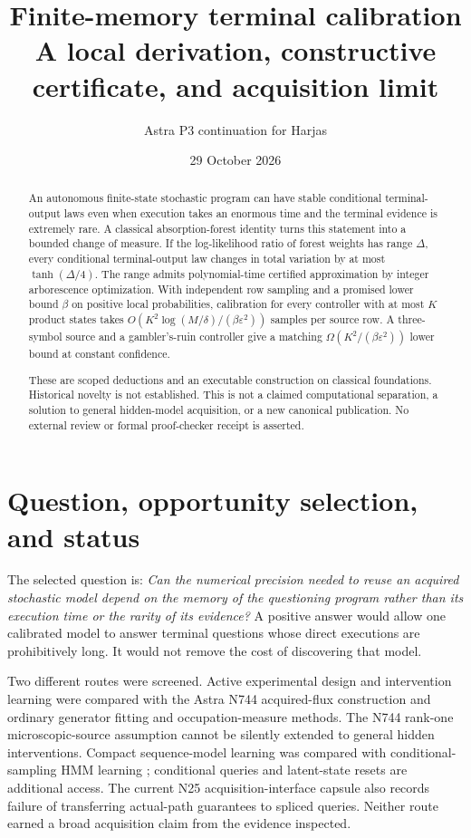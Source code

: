 \documentclass[11pt]{article}
\title{Finite-memory terminal calibration\\
\large A local derivation, constructive certificate, and acquisition limit}
\author{Astra P3 continuation for Harjas}
\date{29 October 2026}
\begin{document}
\maketitle

\begin{abstract}
An autonomous finite-state stochastic program can have stable conditional
terminal-output laws even when execution takes an enormous time and the
terminal evidence is extremely rare. A classical absorption-forest identity
turns this statement into a bounded change of measure. If the log-likelihood
ratio of forest weights has range $\Delta$, every conditional terminal-output
law changes in total variation by at most $\tanh(\Delta/4)$. The range admits
polynomial-time certified approximation by integer arborescence optimization.
With independent row sampling and a promised lower bound $\beta$ on positive
local probabilities, calibration for every controller with at most $K$
product states takes $O(K^2\log(M/\delta)/(\beta\varepsilon^2))$ samples per
source row. A three-symbol source and a gambler's-ruin controller give a
matching $\Omega(K^2/(\beta\varepsilon^2))$ lower bound at constant confidence.

These are scoped deductions and an executable construction on classical
foundations. Historical novelty is not established. This is not a claimed
computational separation, a solution to general hidden-model acquisition,
or a new canonical publication. No external review or formal proof-checker
receipt is asserted.
\end{abstract}

\section{Question, opportunity selection, and status}

The selected question is: \emph{Can the numerical precision needed to reuse
an acquired stochastic model depend on the memory of the questioning
program rather than its execution time or the rarity of its evidence?}
A positive answer would allow one calibrated model to answer terminal
questions whose direct executions are prohibitively long. It would not
remove the cost of discovering that model.

Two different routes were screened. Active experimental design and
intervention learning were compared with the Astra N744 acquired-flux
construction and ordinary generator fitting and occupation-measure methods.
The N744 rank-one microscopic-source assumption cannot be silently extended
to general hidden interventions. Compact sequence-model learning was
compared with conditional-sampling HMM learning \cite{mahajan}; conditional
queries and latent-state resets are additional access. The current N25
acquisition-interface capsule also records failure of transferring
actual-path guarantees to spliced queries. Neither route earned a broad
acquisition claim from the evidence inspected.
\end{document}
